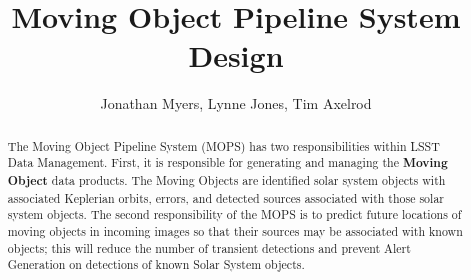 \documentclass[12pt,preprint]{aastex}
\begin{document}
\title{Moving Object Pipeline System Design}

\author{Jonathan Myers, Lynne Jones, Tim Axelrod}

\begin{abstract}

The Moving Object Pipeline System (MOPS) has two responsibilities
within LSST Data Management.  First, it is responsible for generating
and managing the \textbf{Moving Object} data products.  The Moving
Objects are identified solar system objects with associated Keplerian
orbits, errors, and detected sources associated with those solar
system objects.  The second responsibility of the MOPS is to predict
future locations of moving objects in incoming images so that their
sources may be associated with known objects; this will reduce the
number of transient detections and prevent Alert Generation on
detections of known Solar System objects.  

\end{abstract}

\tableofcontents
\listoffigures




















\end{document}
